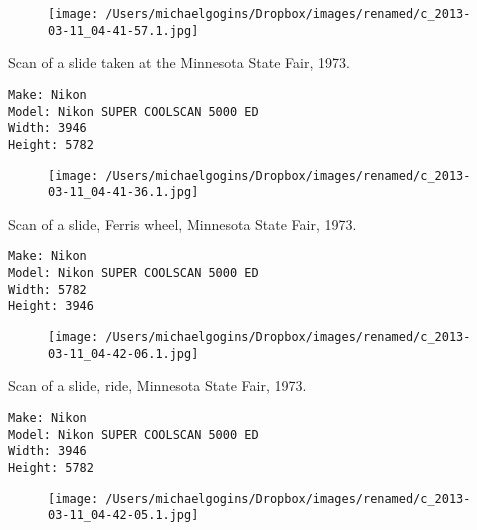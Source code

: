 \documentclass[11pt,letter,DIV=14,paper=landscape]{scrbook}
\begin{document}
\begin{figure}
\texttt{[image: /Users/michaelgogins/Dropbox/images/renamed/c\_2013-03-11\_04-41-57.1.jpg]}
\end{figure}
    
\clearpage
\noindent Scan of a slide taken at the Minnesota State Fair, 1973.
\noindent
\begin{lstlisting}
Make: Nikon
Model: Nikon SUPER COOLSCAN 5000 ED
Width: 3946
Height: 5782
\end{lstlisting}
\clearpage

\begin{figure}
\texttt{[image: /Users/michaelgogins/Dropbox/images/renamed/c\_2013-03-11\_04-41-36.1.jpg]}
\end{figure}
    
\clearpage
\noindent Scan of a slide, Ferris wheel, Minnesota State Fair, 1973.
\noindent
\begin{lstlisting}
Make: Nikon
Model: Nikon SUPER COOLSCAN 5000 ED
Width: 5782
Height: 3946
\end{lstlisting}
\clearpage

\begin{figure}
\texttt{[image: /Users/michaelgogins/Dropbox/images/renamed/c\_2013-03-11\_04-42-06.1.jpg]}
\end{figure}
    
\clearpage
\noindent Scan of a slide, ride, Minnesota State Fair, 1973.
\noindent
\begin{lstlisting}
Make: Nikon
Model: Nikon SUPER COOLSCAN 5000 ED
Width: 3946
Height: 5782
\end{lstlisting}
\clearpage

\begin{figure}
\texttt{[image: /Users/michaelgogins/Dropbox/images/renamed/c\_2013-03-11\_04-42-05.1.jpg]}
\end{figure}
    
\end{document}
